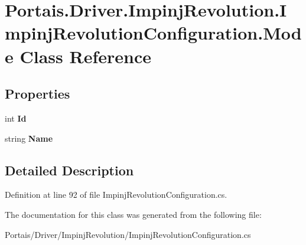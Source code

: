 \hypertarget{class_portais_1_1_driver_1_1_impinj_revolution_1_1_impinj_revolution_configuration_1_1_mode}{}\section{Portais.\+Driver.\+Impinj\+Revolution.\+Impinj\+Revolution\+Configuration.\+Mode Class Reference}
\label{class_portais_1_1_driver_1_1_impinj_revolution_1_1_impinj_revolution_configuration_1_1_mode}
\subsection*{Properties}
\begin{DoxyCompactItemize}
\item 
int {\bfseries Id}\hypertarget{class_portais_1_1_driver_1_1_impinj_revolution_1_1_impinj_revolution_configuration_1_1_mode_aa9260b9497b09a597b10e5b3f02c8e53}{}\label{class_portais_1_1_driver_1_1_impinj_revolution_1_1_impinj_revolution_configuration_1_1_mode_aa9260b9497b09a597b10e5b3f02c8e53}

\item 
string {\bfseries Name}\hypertarget{class_portais_1_1_driver_1_1_impinj_revolution_1_1_impinj_revolution_configuration_1_1_mode_aa0e60fee3efe9abf334ee48fa05f6842}{}\label{class_portais_1_1_driver_1_1_impinj_revolution_1_1_impinj_revolution_configuration_1_1_mode_aa0e60fee3efe9abf334ee48fa05f6842}

\end{DoxyCompactItemize}


\subsection{Detailed Description}


Definition at line 92 of file Impinj\+Revolution\+Configuration.\+cs.



The documentation for this class was generated from the following file\+:\begin{DoxyCompactItemize}
\item 
Portais/\+Driver/\+Impinj\+Revolution/Impinj\+Revolution\+Configuration.\+cs\end{DoxyCompactItemize}
